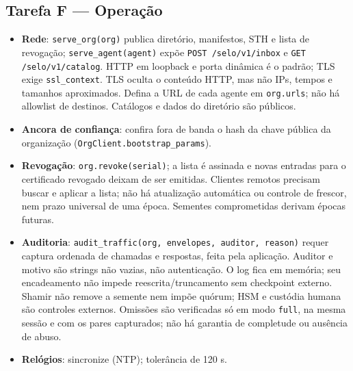 \documentclass[11pt,a4paper]{article}
\theoremstyle{plain}
\theoremstyle{definition}
\theoremstyle{remark}
\newcommand{\cod}[1]{\texttt{#1}}
\begin{document}
\subsection*{Tarefa F --- Operação}
\begin{itemize}
  \item \textbf{Rede}: \cod{serve\_org(org)} publica diretório, manifestos, STH e lista de revogação; \cod{serve\_agent(agent)} expõe \cod{POST /selo/v1/inbox} e \cod{GET /selo/v1/catalog}. HTTP em loopback e porta dinâmica é o padrão; TLS exige \cod{ssl\_context}. TLS oculta o conteúdo HTTP, mas não IPs, tempos e tamanhos aproximados. Defina a URL de cada agente em \cod{org.urls}; não há allowlist de destinos. Catálogos e dados do diretório são públicos.
  \item \textbf{Ancora de confiança}: confira fora de banda o hash da chave pública da organização (\cod{OrgClient.bootstrap\_params}).
  \item \textbf{Revogação}: \cod{org.revoke(serial)}; a lista é assinada e novas entradas para o certificado revogado deixam de ser emitidas. Clientes remotos precisam buscar e aplicar a lista; não há atualização automática ou controle de frescor, nem prazo universal de uma época. Sementes comprometidas derivam épocas futuras.
  \item \textbf{Auditoria}: \cod{audit\_traffic(org, envelopes, auditor, reason)} requer captura ordenada de chamadas e respostas, feita pela aplicação. Auditor e motivo são strings não vazias, não autenticação. O log fica em memória; seu encadeamento não impede reescrita/truncamento sem checkpoint externo. Shamir não remove a semente nem impõe quórum; HSM e custódia humana são controles externos. Omissões são verificadas só em modo \cod{full}, na mesma sessão e com os pares capturados; não há garantia de completude ou ausência de abuso.
  \item \textbf{Relógios}: sincronize (NTP); tolerância de 120 s.
\end{itemize}
\end{document}
